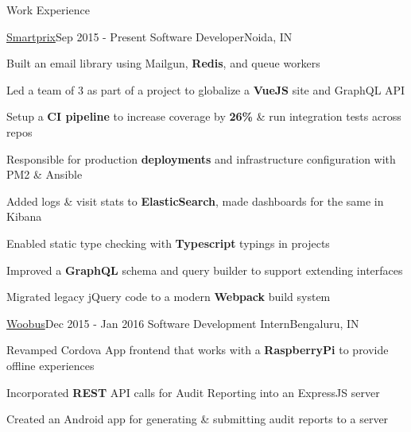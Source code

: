 \documentclass{resume} %
\begin{document}
\begin{rSection}{Work Experience}

    \begin{rSubsection}{\href{https://github.com/smartprix}{Smartprix}}{Sep 2015 - Present}
        {Software Developer}{Noida, IN}

        \item Built an email library using Mailgun, \textbf{Redis}, and queue workers
        \item Led a team of 3 as part of a project to globalize a \textbf{VueJS} site and GraphQL API
        \item Setup a \textbf{CI pipeline} to increase coverage by \textbf{26\%} \& run integration tests across repos
        \item Responsible for production \textbf{deployments} and infrastructure configuration with PM2 \& Ansible 
        \item Added logs \& visit stats to \textbf{ElasticSearch}, made dashboards for the same in Kibana
        \item Enabled static type checking with \textbf{Typescript} typings in projects
        \item Improved a \textbf{GraphQL} schema and query builder to support extending interfaces
        \item Migrated legacy jQuery code to a modern \textbf{Webpack} build system
    \end{rSubsection}


    \begin{rSubsection}{\href{https://github.com/rohit-smpx?tab=repositories&q=Woobus&type=public}{Woobus}}{Dec 2015 - Jan 2016}
        {Software Development Intern}{Bengaluru, IN}

        \item Revamped Cordova App frontend that works with a \textbf{RaspberryPi} to provide offline experiences
        \item Incorporated \textbf{REST} API calls for Audit Reporting into an ExpressJS server
        \item Created an Android app for generating \& submitting audit reports to a server
    \end{rSubsection}

\end{rSection}
\end{document}
